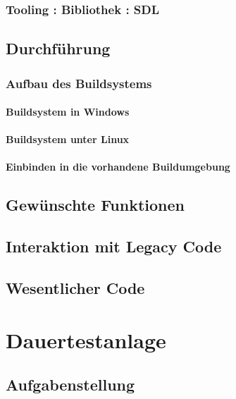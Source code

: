 \subsubsection{Tooling : Bibliothek : SDL}
\cite*{sdlwebsite}
\subsection{Durchführung}
\subsubsection{Aufbau des Buildsystems}
\paragraph*{Buildsystem in Windows}
\paragraph*{Buildsystem unter Linux}
\paragraph*{Einbinden in die vorhandene Buildumgebung}
\subsection{Gewünschte Funktionen}
\subsection{Interaktion mit Legacy Code}
\subsection{Wesentlicher Code}

\section{Dauertestanlage}
\subsection{Aufgabenstellung}
